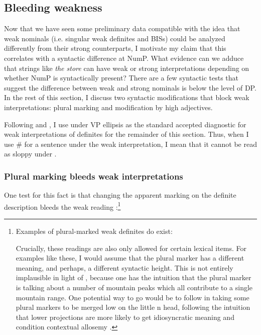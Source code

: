\documentclass[output=paper,
modfonts
]{langscibook}
\begin{document}
\subsection{Bleeding weakness}

Now that we have seen some preliminary data compatible with the idea that weak nominals (i.e. singular weak definites and BISs) could be analyzed differently from their strong counterparts, I motivate my claim that this correlates with a syntactic difference  at NumP. What evidence can we adduce that strings like \textit{the store} can have weak or strong interpretations depending on whether NumP is syntactically present? There are a few syntactic tests that suggest the difference between weak and strong nominals is below the level of DP. In the rest of this section, I discuss two syntactic modifications that block weak interpretations: plural marking and modification by high adjectives.

Following \citet{CarlsonSussman2005} and \citet{Aguilar-Guevara2014}, I use  under VP ellipsis as the standard accepted diagnostic for weak interpretations of definites for the remainder of this section. Thus, when I use \# for a sentence under the weak interpretation, I mean that it cannot be read as sloppy under .

\subsubsection{Plural marking bleeds weak interpretations}

One test for this fact is that changing the apparent  marking on the definite description bleeds the weak reading \citep[19]{Aguilar-Guevara2014}:\footnote{Examples of plural-marked weak definites do exist:
\begin{exe}
 \end{exe}
Crucially, these readings are also only allowed for certain lexical items. For examples like these, I would assume that the plural marker has a different meaning, and perhaps, a different syntactic height. This is not entirely implausible in light of , because one has the intuition that the plural marker is talking about a number of mountain peaks which all contribute to a single mountain range. One potential way to go would be to follow \citet{Kramer2015} in taking some plural markers to be merged low on the little n head, following the intuition that lower projections are more likely to get idiosyncratic meaning and condition contextual allosemy \citep{romanova2005,svenonius2005,marantz2013}.}
\end{document}

